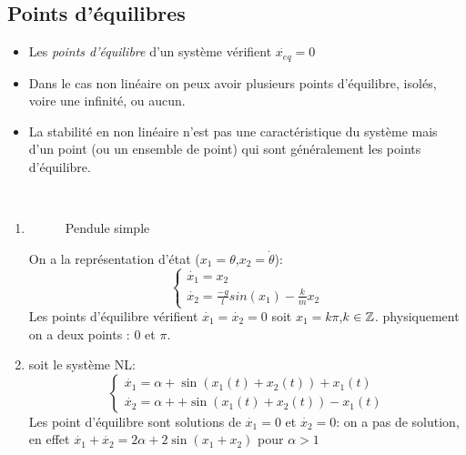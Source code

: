 \documentclass[main.tex]{subfiles}
\begin{document}
\subsection{Points d'équilibres}

\begin{defin}
  \begin{itemize}
  \item Les \emph{points d'équilibre} d'un système vérifient $\dot{x_{eq}} = 0$

  \item  Dans le cas non linéaire on peux avoir plusieurs points d'équilibre, isolés, voire une infinité, ou aucun.

  \item La stabilité en non linéaire n'est pas une caractéristique du système mais d'un point (ou un ensemble de point) qui sont généralement les points d'équilibre.
\end{itemize}
\end{defin}

\begin{exemple} \\

\begin{enumerate}
\item
  \begin{figure}[H]
    \centering
    \caption{Pendule simple}
  \end{figure}
  On a la représentation d'état ($x_1=\theta$,$x_2=\dot{\theta}$):
  \[
    \begin{cases}
     \dot{ x_1} = x_2\\
     \dot{x_2} = \frac{-g}{l}sin(x_1)-\frac{k}{m}x_2
    \end{cases}
  \]
Les points d'équilibre vérifient $\dot{x_1}=\dot{x_2} = 0$ soit $x_1= k\pi$,$k\in\mathbb{Z}$. physiquement on a deux points : $0$ et $\pi$.

\item soit le système NL:
  \[
    \begin{cases}

    \dot{x_1}= \alpha + \sin(x_1(t)+x_2(t))+x_1(t)\\
    \dot{x_2}=\alpha+ + \sin(x_1(t)+x_2(t))-x_1(t)
  \end{cases}
\]
Les point d'équilibre sont solutions de $\dot{x_1}=0$ et $\dot{x_2}=0$: on a pas de solution, en effet $\dot{x_1}+\dot{x_2} = 2\alpha+2\sin(x_1+x_2)$ pour $\alpha>1$
\end{enumerate}

\end{exemple}
\end{document}
